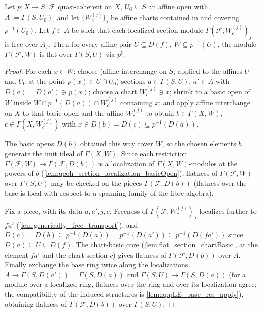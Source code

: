 \begin{lemma}
  \leanok
  \label{lem:flat_section_pair}
  Let \(p : X \to S\), \(\mathcal F\) quasi-coherent on \(X\),
  \(U_0 \subseteq S\) an affine open with \(A := \Gamma(S, U_0)\), and let
  \(\{W_c^{(j)}\}_{j}\) be affine charts contained in and covering
  \(p^{-1}(U_0)\). Let \(f \in A\) be such that each localized section
  module \(\Gamma(\mathcal F, W_c^{(j)})_f\) is free over \(A_f\). Then for
  every affine pair \(U \subseteq D(f)\), \(W \subseteq p^{-1}(U)\), the
  module \(\Gamma(\mathcal F, W)\) is flat over \(\Gamma(S, U)\) via
  \(p^\sharp\).
\end{lemma}
\begin{proof}
  \leanok
  For each \(x \in W\): choose (affine interchange on \(S\), applied to the
  affines \(U\) and \(U_0\) at the point \(p(x) \in U \cap U_0\)) sections
  \(a \in \Gamma(S, U)\), \(a' \in A\) with
  \(D(a) = D(a') \ni p(x)\); choose a chart \(W_c^{(j)} \ni x\); shrink to a
  basic open of \(W\) inside \(W \cap p^{-1}(D(a)) \cap W_c^{(j)}\)
  containing \(x\); and apply affine interchange on \(X\) to that basic open
  and the affine \(W_c^{(j)}\) to obtain \(b \in \Gamma(X, W)\),
  \(c \in \Gamma(X, W_c^{(j)})\) with
  \(x \in D(b) = D(c) \subseteq p^{-1}(D(a))\).

  The basic opens \(D(b)\) obtained this way cover \(W\), so the chosen
  elements \(b\) generate the unit ideal of \(\Gamma(X, W)\). Since each
  restriction \(\Gamma(\mathcal F, W) \to \Gamma(\mathcal F, D(b))\) is a
  localization of \(\Gamma(X, W)\)-modules at the powers of \(b\)
  (\cref{lem:qcoh_section_localization_basicOpen}), flatness of
  \(\Gamma(\mathcal F, W)\) over \(\Gamma(S, U)\) may be checked on the
  pieces \(\Gamma(\mathcal F, D(b))\) (flatness over the base is local with
  respect to a spanning family of the fibre algebra).

  Fix a piece, with its data \(a, a', j, c\). Freeness of
  \(\Gamma(\mathcal F, W_c^{(j)})_f\) localizes further to
  \(f a'\) (\cref{lem:generically_free_transport}), and
  \(D(c) = D(b) \subseteq p^{-1}(D(a)) = p^{-1}(D(a'))
  \subseteq p^{-1}(D(f a'))\) since \(D(a) \subseteq U \subseteq D(f)\).
  The chart-basic core (\cref{lem:flat_section_chartBasic}, at the element
  \(f a'\) and the chart section \(c\)) gives flatness of
  \(\Gamma(\mathcal F, D(b))\) over \(A\). Finally exchange the base ring
  twice along the localizations \(A \to \Gamma(S, D(a')) = \Gamma(S, D(a))\)
  and \(\Gamma(S, U) \to \Gamma(S, D(a))\) (for a module over a localized
  ring, flatness over the ring and over its localization agree; the
  compatibility of the induced structures is
  \cref{lem:appLE_base_res_apply}), obtaining flatness of
  \(\Gamma(\mathcal F, D(b))\) over \(\Gamma(S, U)\).
\end{proof}

